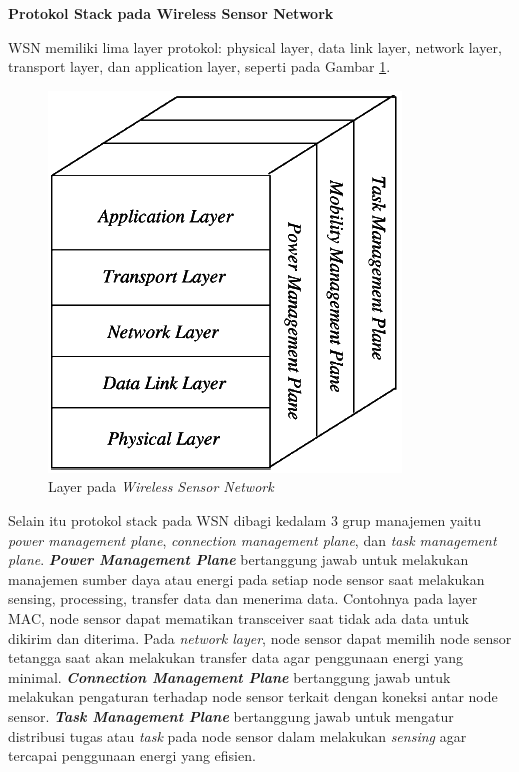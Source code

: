 \documentclass[a4paper,twoside]{article}
\begin{document}
\begin{enumerate}
\begin{table}[H]
\begin{tabular}{| p{1.6cm} | p{3.8cm} | p{2.5cm} | p{3cm} | p{4cm} |}
		\bottomrule
		
	\end{tabular} 
\end{table}

\textbf{Protokol Stack pada Wireless Sensor Network}

WSN memiliki lima layer protokol: physical layer, data link layer, network layer, transport layer, dan application layer, seperti pada Gambar \ref{fig:layer}. 

\begin{figure} [H]
	\centering  
	\includegraphics[scale=0.5]{Gambar/layer}  
	\caption[Layer pada \textit{Wireless Sensor Network}]{Layer pada \textit{Wireless Sensor Network}} 
	\label{fig:layer} 
\end{figure} 

Selain itu protokol stack pada WSN dibagi kedalam 3 grup manajemen yaitu \textit{power management plane}, \textit{connection management plane}, dan \textit{task management plane}. \textbf{\textit{Power Management Plane}} bertanggung jawab untuk melakukan manajemen sumber daya atau energi pada setiap node sensor saat melakukan sensing, processing, transfer data dan menerima data. Contohnya pada layer MAC, node sensor dapat mematikan transceiver saat tidak ada data untuk dikirim dan diterima. Pada \textit{network layer}, node sensor dapat memilih node sensor tetangga saat akan melakukan transfer data agar penggunaan energi yang minimal. \textbf{\textit{Connection Management Plane}} bertanggung jawab untuk melakukan pengaturan terhadap node sensor terkait dengan koneksi antar node sensor. \textbf{\textit{Task Management Plane}} bertanggung jawab untuk mengatur distribusi tugas atau \textit{task} pada node sensor dalam melakukan \textit{sensing} agar tercapai penggunaan energi yang efisien.


\end{enumerate}
\end{document}
